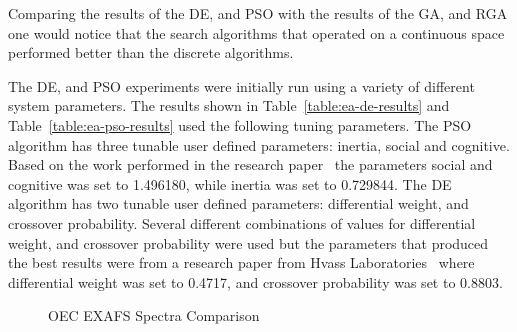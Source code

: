 Comparing the results of the DE, and PSO with the results of the GA, and RGA one would notice that the search algorithms that operated on a continuous space performed better than the discrete algorithms.

The DE, and PSO experiments were initially run using a variety of different system parameters. The results shown in Table~\ref{table:ea-de-results} and Table~\ref{table:ea-pso-results} used the following tuning parameters. The PSO algorithm has three tunable user defined parameters: inertia, social and cognitive. Based on the work performed in the research paper~\cite{eberhart2000comparing} the parameters social and cognitive was set to 1.496180, while inertia was set to 0.729844. The DE algorithm has two tunable user defined parameters: differential weight, and crossover probability. Several different combinations of values for differential weight, and crossover probability were used but the parameters that produced the best results were from a research paper from Hvass Laboratories~\cite{pedersen2010good} where differential weight was set to 0.4717, and crossover probability was set to 0.8803.

\begin{figure*}
	\centering
	\caption{OEC EXAFS Spectra Comparison}
	\label{fig:bestRunEXAFS}
\end{figure*}